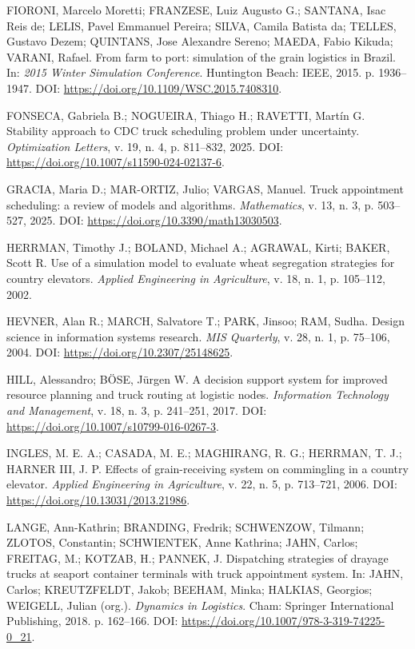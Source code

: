 \documentclass[
  12pt,
  oneside,
  a4paper,
  sumario=tradicional,
  brazil
]{abntex2}
\begin{document}
FIORONI, Marcelo Moretti; FRANZESE, Luiz Augusto G.; SANTANA, Isac Reis de; LELIS, Pavel Emmanuel Pereira; SILVA, Camila Batista da; TELLES, Gustavo Dezem; QUINTANS, Jose Alexandre Sereno; MAEDA, Fabio Kikuda; VARANI, Rafael. From farm to port: simulation of the grain logistics in Brazil. In: \textit{2015 Winter Simulation Conference}. Huntington Beach: IEEE, 2015. p. 1936--1947. DOI: \url{https://doi.org/10.1109/WSC.2015.7408310}.

FONSECA, Gabriela B.; NOGUEIRA, Thiago H.; RAVETTI, Mart\'in G. Stability approach to CDC truck scheduling problem under uncertainty. \textit{Optimization Letters}, v. 19, n. 4, p. 811--832, 2025. DOI: \url{https://doi.org/10.1007/s11590-024-02137-6}.

GRACIA, Maria D.; MAR-ORTIZ, Julio; VARGAS, Manuel. Truck appointment scheduling: a review of models and algorithms. \textit{Mathematics}, v. 13, n. 3, p. 503--527, 2025. DOI: \url{https://doi.org/10.3390/math13030503}.

HERRMAN, Timothy J.; BOLAND, Michael A.; AGRAWAL, Kirti; BAKER, Scott R. Use of a simulation model to evaluate wheat segregation strategies for country elevators. \textit{Applied Engineering in Agriculture}, v. 18, n. 1, p. 105--112, 2002.

HEVNER, Alan R.; MARCH, Salvatore T.; PARK, Jinsoo; RAM, Sudha. Design science in information systems research. \textit{MIS Quarterly}, v. 28, n. 1, p. 75--106, 2004. DOI: \url{https://doi.org/10.2307/25148625}.

HILL, Alessandro; B\"OSE, J\"urgen W. A decision support system for improved resource planning and truck routing at logistic nodes. \textit{Information Technology and Management}, v. 18, n. 3, p. 241--251, 2017. DOI: \url{https://doi.org/10.1007/s10799-016-0267-3}.

INGLES, M. E. A.; CASADA, M. E.; MAGHIRANG, R. G.; HERRMAN, T. J.; HARNER III, J. P. Effects of grain-receiving system on commingling in a country elevator. \textit{Applied Engineering in Agriculture}, v. 22, n. 5, p. 713--721, 2006. DOI: \url{https://doi.org/10.13031/2013.21986}.

LANGE, Ann-Kathrin; BRANDING, Fredrik; SCHWENZOW, Tilmann; ZLOTOS, Constantin; SCHWIENTEK, Anne Kathrina; JAHN, Carlos; FREITAG, M.; KOTZAB, H.; PANNEK, J. Dispatching strategies of drayage trucks at seaport container terminals with truck appointment system. In: JAHN, Carlos; KREUTZFELDT, Jakob; BEEHAM, Minka; HALKIAS, Georgios; WEIGELL, Julian (org.). \textit{Dynamics in Logistics}. Cham: Springer International Publishing, 2018. p. 162--166. DOI: \url{https://doi.org/10.1007/978-3-319-74225-0_21}.
\end{document}
